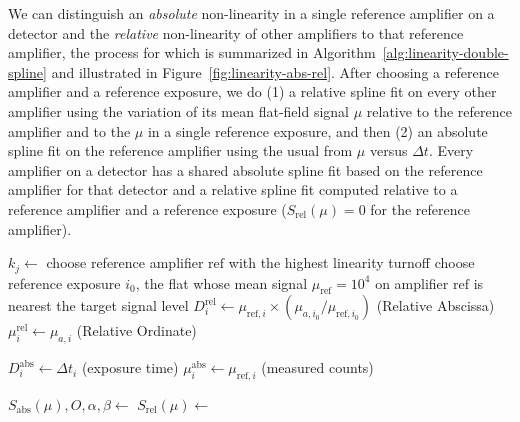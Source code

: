 We can distinguish an \emph{absolute} non-linearity in a single reference amplifier on a detector and the \emph{relative} non-linearity of other amplifiers to that reference amplifier, the process for which is summarized in Algorithm~\ref{alg:linearity-double-spline} and illustrated in Figure~\ref{fig:linearity-abs-rel}.
After choosing a reference amplifier and a reference exposure, we do (1) a relative spline fit on every other amplifier using  the variation of its mean flat-field signal $\mu$ relative to the reference amplifier and to the $\mu$ in a single reference exposure, and then (2)
an absolute spline fit on the reference amplifier using the usual from $\mu$ versus $\Delta t$.
Every amplifier on a detector has a shared absolute spline fit based on the reference amplifier for that detector and a relative spline fit computed relative to a reference amplifier and a reference exposure ($S_{\mathrm{rel}}(\mu) = 0$ for the reference amplifier).

\begin{algorithm}[H]
\caption{Double-spline linearity fit (single detector)}
\label{alg:linearity-double-spline}
\begin{algorithmic}[1]
    \State $k_j \leftarrow$ 
    \State {}
\EndFor
\State choose reference amplifier $\mathrm{ref}$ with the highest linearity turnoff
\State choose reference exposure $i_0$, the flat whose mean signal $\mu_{\mathrm{ref}} = 10^4$ on amplifier $\mathrm{ref}$ is nearest the target signal level
        \State $D^{\mathrm{rel}}_{i} \leftarrow \mu_{\mathrm{ref}, i} \times (\mu_{a,i_0} / \mu_{\mathrm{ref}, i_0})$  (Relative Abscissa) %
        \State $\mu^{\mathrm{rel}}_{i} \leftarrow \mu_{a,i}$ (Relative Ordinate)
    \EndFor

    \State $D^{\mathrm{abs}}_{i} \leftarrow \Delta t_i$ (exposure time)
    \State $\mu^{\mathrm{abs}}_{i} \leftarrow \mu_{\mathrm{ref},i}$ (measured counts)
\EndFor

\Statex {}
\State $S_{\mathrm{abs}}(\mu), O, \alpha, \beta \leftarrow$ 
\State $S_{\mathrm{rel}}(\mu) \leftarrow$ 
\end{algorithmic}
\end{algorithm}

